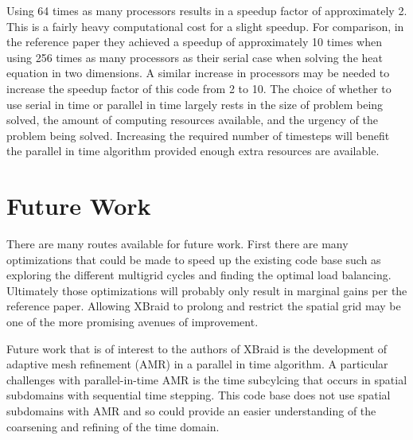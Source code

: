 \documentclass{article}
\begin{document}
Using 64 times as many processors results in a speedup factor of approximately 2.
This is a fairly heavy computational cost for a slight speedup.
For comparison, in the reference paper\cite{falgout2014} they achieved a speedup of approximately 10 times when using 256 times as many processors as their serial case when solving the heat equation in two dimensions.
A similar increase in processors may be needed to increase the speedup factor of this code from 2 to 10.
The choice of whether to use serial in time or parallel in time largely rests in the size of problem being solved, the amount of computing resources available, and the urgency of the problem being solved.
Increasing the required number of timesteps will benefit the parallel in time algorithm provided enough extra resources are available.

\section{Future Work}\label{future-work}

There are many routes available for future work.
First there are many optimizations that could be made to speed up the existing code base such as exploring the different multigrid cycles and finding the optimal load balancing.
Ultimately those optimizations will probably only result in marginal gains per the reference paper\cite{falgout2014}.
Allowing XBraid to prolong and restrict the spatial grid may be one of the more promising avenues of improvement.

Future work that is of interest to the authors of XBraid is the development of adaptive mesh refinement (AMR) in a parallel in time algorithm.
A particular challenges with parallel-in-time AMR is the time subcylcing that occurs in spatial subdomains with sequential time stepping.
This code base does not use spatial subdomains with AMR and so could provide an easier understanding of the coarsening and refining of the time domain.



\end{document}

